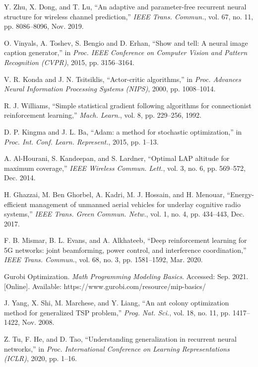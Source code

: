 \documentclass[journal]{IEEEtran}
\begin{document}
\begin{thebibliography}{1}
         Y. Zhu, X. Dong, and T. Lu, ``An adaptive and parameter-free recurrent neural structure for wireless channel prediction,'' \emph{IEEE Trans. Commun.}, vol. 67, no. 11, pp. 8086--8096, Nov. 2019.



         O. Vinyals, A. Toshev, S. Bengio and D. Erhan, ``Show and tell: A neural image caption generator,'' in \emph{Proc. IEEE Conference on Computer Vision and Pattern Recognition (CVPR)}, 2015, pp. 3156--3164.


         V. R. Konda and J. N. Tsitsiklis, ``Actor-critic algorithms,'' in \emph{Proc. Advances Neural Information Processing Systems (NIPS)}, 2000, pp. 1008--1014.


         R. J. Williams, ``Simple statistical gradient following algorithms for connectionist reinforcement learning,'' \emph{Mach. Learn.}, vol. 8, pp. 229--256, 1992.

         D. P. Kingma and J. L. Ba, ``Adam: a method for stochastic optimization,'' in \emph{Proc. Int. Conf. Learn. Represent.}, 2015, pp. 1--13.


          {A. Al-Hourani, S. Kandeepan, and S. Lardner, ``Optimal LAP altitude for maximum coverage,'' \emph{IEEE Wireless Commun. Lett.}, vol. 3, no. 6, pp. 569--572, Dec. 2014.}

          {H. Ghazzai, M. Ben Ghorbel, A. Kadri, M. J. Hossain, and H. Menouar, ``Energy-efficient management of unmanned aerial vehicles for underlay cognitive radio systems,'' \emph{ IEEE Trans. Green Commun. Netw.}, vol. 1, no. 4, pp. 434--443, Dec. 2017.}


         F. B. Mismar, B. L. Evans, and A. Alkhateeb, ``Deep reinforcement learning for 5G networks: joint beamforming, power control, and interference coordination,'' \emph{IEEE Trans. Commun.}, vol. 68, no. 3, pp. 1581--1592, Mar. 2020.

         Gurobi Optimization. \textit{Math Programming Modeling Basics}. Accessed: Sep. 2021. [Online]. Available: https://www.gurobi.com/resource/mip-basics/



         {J. Yang, X. Shi, M. Marchese, and Y. Liang, ``An ant colony optimization method for generalized TSP problem,'' \emph{Prog. Nat. Sci.}, vol. 18, no. 11, pp. 1417--1422, Nov. 2008.}



         Z. Tu, F. He, and D. Tao, ``Understanding generalization in recurrent neural networks,'' in \emph{Proc. International  Conference  on  Learning  Representations (ICLR)}, 2020, pp. 1--16.

\end{thebibliography}
\end{document}
